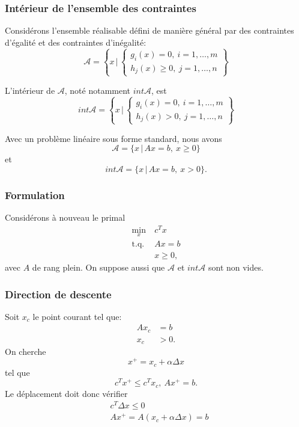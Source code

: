 \documentclass[usepdftitle=false]{beamer}
\def\cA{\mathcal{A}}
\begin{document}
\begin{frame}
\frametitle{Intérieur de l'ensemble des contraintes}

Considérons l'ensemble réalisable défini de manière général par des contraintes d'égalité et des contraintes d'inégalité:
$$
\cA = \left\{ x \,\bigg|\, \begin{cases}
g_i(x) = 0,\ i = 1,\ldots,m \\
h_j(x) \geq 0,\ j = 1,\ldots,n
\end{cases}
\right\}
$$

L'intérieur de $\cA$, noté notamment $int \cA$, est
$$
int \cA = \left\{ x \,\bigg|\, \begin{cases}
g_i(x) = 0,\ i = 1,\ldots,m \\
h_j(x) > 0,\ j = 1,\ldots,n
\end{cases}
\right\}
$$

Avec un problème linéaire sous forme standard, nous avons
$$
\cA = \{ x \,|\, Ax = b,\ x \geq 0 \}
$$
et
$$
int\cA = \{ x \,|\, Ax = b,\ x > 0 \}.
$$

\end{frame}

\begin{frame}
\frametitle{Formulation}

Considérons à nouveau le primal
\begin{align*}
\min_x \ & c^Tx \\
\mbox{t.q. } & Ax = b\\
& x \geq 0,
\end{align*}
avec $A$ de rang plein. On suppose aussi que $\cA$ et $int\cA$ sont non vides.

\end{frame}

\begin{frame}
\frametitle{Direction de descente}

Soit $x_c$ le point courant tel que:
\begin{align*}
Ax_c &= b \\
x_c &> 0.
\end{align*}
On cherche
$$
x^+ = x_c + \alpha \Delta x
$$
tel que
$$
c^Tx^+ \leq c^T x_c,\ Ax^+ = b.
$$
Le déplacement doit donc vérifier
\begin{align*}
& c^T \Delta x \leq 0 \\
& Ax^+ = A(x_c + \alpha \Delta x) = b
\end{align*}

\end{frame}
\end{document}
